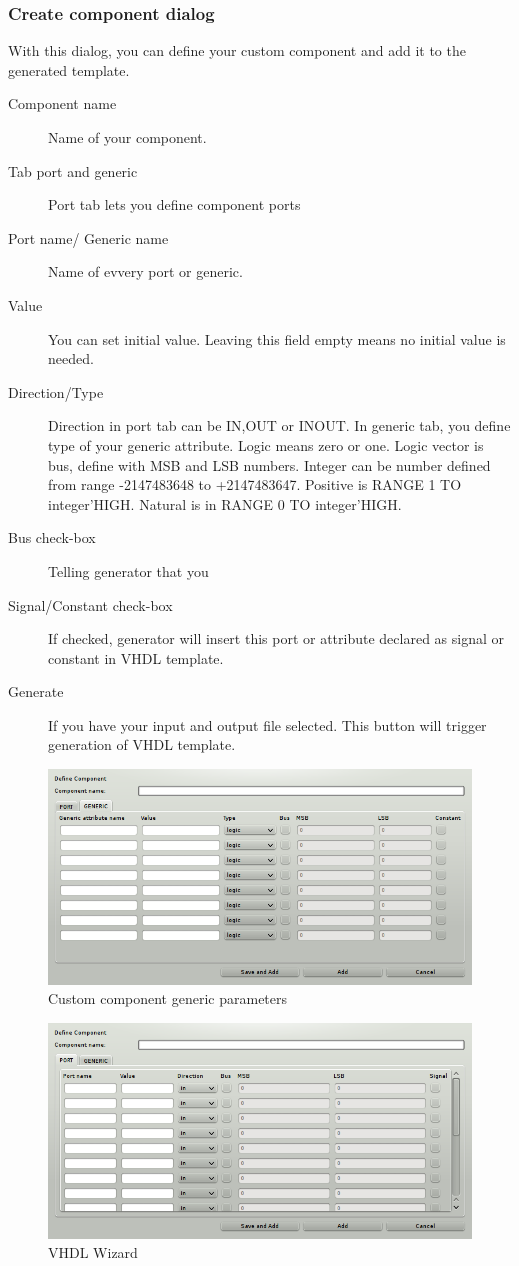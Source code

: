\subsubsection{Create component dialog}
    With this dialog, you can define your custom component and add it to the generated template. 
    \begin{description}
        \item [Component name]
            Name of your component.
        \item [Tab port and generic]
            Port tab lets you define component ports
        \item [Port name/ Generic name]
            Name of evvery port or generic.
        \item [Value]
            You can set initial value. Leaving this field empty means no initial value is needed.
        \item [Direction/Type]
            Direction in port tab can be IN,OUT or INOUT. In generic tab, you define type of your generic attribute. Logic means zero or one. Logic vector is bus, define with MSB and LSB numbers.
            Integer can be number defined from range -2147483648 to +2147483647. Positive is RANGE 1 TO integer’HIGH. Natural is in RANGE 0 TO integer’HIGH.
        \item [Bus check-box]
            Telling generator that you
        \item [Signal/Constant check-box]
            If checked, generator will insert this port or attribute declared as signal or constant in VHDL template.
        \item [Generate]
            If you have your input and output file selected. This button will trigger generation of VHDL template.
    \end{description}

\begin{figure}[h]
    \centering
    \includegraphics[width=.5\textwidth]{img/VHDL_create_generic.png}
    \caption{Custom component generic parameters}
\end{figure}

\begin{figure}[h]
    \centering
    \includegraphics[width=.5\textwidth]{img/VHDL_create_component.png}
    \caption{VHDL Wizard}
\end{figure}


